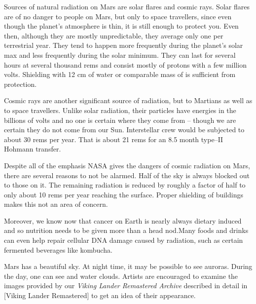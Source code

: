 Sources of natural radiation on Mars are solar flares and cosmic rays. Solar flares are of no danger to people on Mars, but only to space travellers, since even though the planet's atmosphere is thin, it is still enough to protect you. Even then, although they are mostly unpredictable, they average only one per terrestrial year. They tend to happen more frequently during the planet's solar max and less frequently during the solar minimum. They can last for several hours at several thousand rems and consist mostly of protons with a few million volts. Shielding with 12 cm of water or comparable mass of  is sufficient from protection.

Cosmic rays are another significant source of radiation, but to Martians as well as to space travellers. Unlike solar radiation, their particles have energies in the billions of volts and no one is certain where they come from -- though we are certain they do not come from our Sun. Interstellar crew would be subjected to about 30 rems per year. That is about 21 rems for an 8.5 month type--II Hohmann transfer.

Despite all of the emphasis NASA gives the dangers of cosmic radiation on Mars, there are several reasons to not be alarmed. Half of the sky is always blocked out to those on it. The remaining radiation is reduced by roughly a factor of half to only about 10 rems per year reaching the surface. Proper shielding of buildings makes this not an area of concern. 

Moreover, we know now that cancer on Earth is nearly always dietary induced and so nutrition needs to be given more than a head nod. Many foods and drinks can even help repair cellular DNA damage caused by radiation, such as certain fermented beverages like kombucha.\footnotecite[cavusoglu2009]

Mars has a beautiful sky. At night time, it may be possible to see auroras. During the day, one can see  and water clouds. Artists are encouraged to examine the images provided by our {\it Viking Lander Remastered Archive} described in detail in [Viking Lander Remastered] to get an idea of their appearance.


